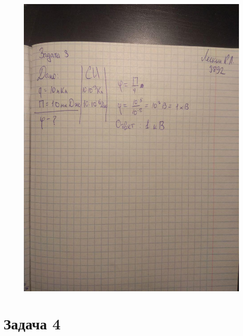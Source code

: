 \documentclass[12pt,a4paper]{article}  %
\begin{document}
	\begin{figure}[hpt!]
		\centering
		\includegraphics[width=1\linewidth]{photo/task3_solution}
	\end{figure}
	
	\section*{Задача 4}
	
\end{document}
